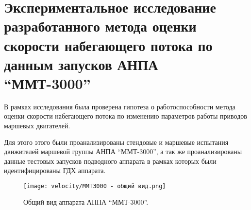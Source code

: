 






\section{Экспериментальное исследование разработанного метода оценки скорости набегающего потока по данным запусков АНПА ``ММТ-3000''}
В рамках исследования была проверена гипотеза о работоспособности метода оценки скорости набегающего потока по изменению параметров работы приводов маршевых двигателей.

Для этого этого были проанализированы стендовые и маршевые испытания движителей маршевой группы АНПА ``ММТ-3000'', а так же проанализированы данные тестовых запусков подводного аппарата в рамках которых были идентифицированы ГДХ аппарата.

\begin{figure}[ht]
    \centering
    \texttt{[image: velocity/MMT3000 - общий вид.png]}
    \caption{Общий вид аппарата АНПА ``ММТ-3000''.}
    \label{fig:mmt-3000}
\end{figure}

